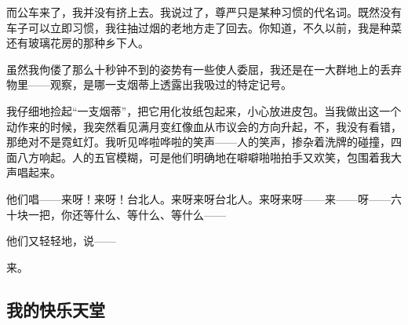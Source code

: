 \par 而公车来了，我并没有挤上去。我说过了，尊严只是某种习惯的代名词。既然没有车子可以立即习惯，我往抽过烟的老地方走了回去。你知道，不久以前，我是种菜还有玻璃花房的那种乡下人。
\par 虽然我佝偻了那么十秒钟不到的姿势有一些使人委屈，我还是在一大群地上的丢弃物里——观察，是哪一支烟蒂上透露出我吸过的特定记号。
\par 我仔细地捡起“一支烟蒂”，把它用化妆纸包起来，小心放进皮包。当我做出这一个动作来的时候，我突然看见满月变红像血从市议会的方向升起，不，我没有看错，那绝对不是霓虹灯。我听见哗啦哗啦的笑声——人的笑声，掺杂着洗牌的碰撞，四面八方响起。人的五官模糊，可是他们明确地在噼噼啪啪拍手又欢笑，包围着我大声唱起来。
\par 他们唱——来呀！来呀！台北人。来呀来呀台北人。来呀来呀——来——呀——六十块一把，你还等什么、等什么、等什么——
\par 他们又轻轻地，说——
\par 来。


\subsection{我的快乐天堂}

